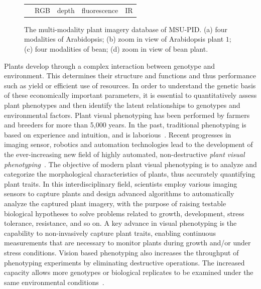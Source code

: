 \begin{figure}
\begin{centering}
\begin{tabular}{@{}c c c c c}
 & RGB & depth & fluorescence & IR\\
\end{tabular}
\caption{The multi-modality plant imagery database of MSU-PID. (a) four modalities of Arabidopsis; (b) zoom in view of Arabidopsis plant $1$; (c) four modalities of bean; (d) zoom in view of bean plant.}
\label{fig:fourmodality}
\end{centering}
\end{figure}


Plants develop through a complex interaction between genotype and environment. This determines their structure and functions and thus performance such as yield or efficient use of resources. In order to understand the genetic basis of these economically important parameters, it is essential to quantitatively assess plant phenotypes and then identify the latent relationships to genotypes and environmental factors. 
%
Plant visual phenotyping has been performed by farmers and breeders for more than 5,000 years. In the past, traditional phenotyping is based on experience and intuition, and is laborious~\cite{Erblichkeit1903}. Recent progresses in imaging sensor, robotics and automation technologies lead to the development of the ever-increasing new field of highly automated, non-destructive {\it plant visual phenotyping}~\cite{furbank2011phenomics,cruz2015depi}. %
%
The objective of modern  plant visual phenotyping is to analyze and categorize the morphological  characteristics of plants, thus accurately quantifying plant traits. %
In this interdisciplinary field, scientists employ various imaging sensors to capture plants and design advanced algorithms to automatically analyze the captured plant imagery, with the purpose of raising testable biological hypotheses to solve problems related to growth, development, stress tolerance, resistance, and so on.
%
%
A key advance in visual phenotyping is the capability to non-invasively capture plant traits, enabling continuous measurements that are necessary to monitor plants during growth and/or under stress conditions. Vision based phenotyping also increases the throughput of phenotyping experiments by eliminating destructive operations. The increased capacity allows more genotypes or biological replicates to be examined under the same environmental conditions~\cite{fahlgren2015lights,walter2015plant}.



